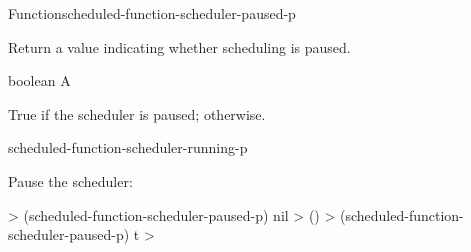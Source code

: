 \documentclass[10pt,twoside,english,pdftex]{article}
\begin{document}

\begin{functiondoc}{Function}{scheduled-function-scheduler-paused-p}%
  {\noargs{}
    }
%

\fnsyntax

\fnpurpose Return a value indicating whether 
scheduling is paused.

\fnpackage {}

\fnmodule {}

\fnargs
\begin{args}{boolean}
\arg[boolean] A 
\end{args}

\fnreturns True if the  scheduler is paused; \nil{}
otherwise.

\fnerrors
\nothreads{}

\begin{alsos}{scheduled-function-scheduler-running-p}
\end{alsos}

%
\fnexample
Pause the  scheduler:
%
\W\supp
\begin{example}
  > (scheduled-function-scheduler-paused-p)
  nil
  > ()
  > (scheduled-function-scheduler-paused-p)
  t
  >
\end{example}

\end{functiondoc}

\end{document}
